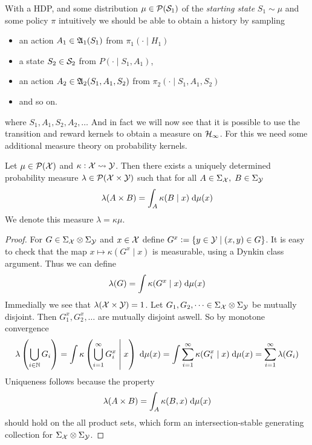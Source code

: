 With a HDP, and some distribution $\mu \in \mathcal{P}(\mathcal{S}_1)$
of the \emph{starting state} $S_1 \sim \mu$
and some policy $\pi$ intuitively we
should be able to obtain a history by sampling
\begin{itemize}
  \item an action $A_1 \in \frak{A}_1(S_1)$ from $\pi_1(\cdot \mid H_1)$
  \item a state $S_2 \in \mathcal{S}_2$ from $P(\cdot \mid S_1, A_1)$,
  \item an action $A_2 \in \frak{A}_2(S_1, A_1, S_2)$ from $\pi_2(\cdot \mid
    S_1, A_1, S_2)$
  \item and so on.
\end{itemize}

where $S_1, A_1, S_2, A_2, \dots$ 
And in fact we will now see that it is possible to use the transition
and reward kernels to obtain a measure on $\mathcal{H}_\infty$.
For this we need some additional measure theory on
probability kernels.

\begin{thm}
  Let $\mu \in \mathcal{P}(\mathcal{X})$ and $\kappa : \mathcal{X} \leadsto \mathcal{Y}$.
  Then there exists a uniquely determined probability measure
  $\lambda \in \mathcal{P}(\mathcal{X} \times \mathcal{Y})$
  such that for all $A \in \Sigma_\mathcal{X}, \; B \in \Sigma_\mathcal{Y}$
  \[ \lambda(A \times B) = \int_A \kappa(B \mid x) \; \mathrm{d} \mu(x) \]
  \label{thm:intKer}
  We denote this measure $\lambda = \kappa \mu$.
\end{thm}
\begin{proof}
  For $G \in \Sigma_\mathcal{X} \otimes \Sigma_\mathcal{Y}$ and $x \in \mathcal{X}$ define
  $G^x \vcentcolon= \{ y \in \mathcal{Y} \mid (x, y) \in G \} $.
  It is easy to check that the map $x \mapsto \kappa(G^x \mid x)$ is
  measurable, using a Dynkin class argument.
  Thus we can define
  \[ \lambda(G) = \int \kappa(G^x \mid x) \; \mathrm{d} \mu(x) \]
  Immedially we see that
  $\lambda(\mathcal{X} \times \mathcal{Y}) = 1$.
  Let $G_1, G_2, \dots \in \Sigma_\mathcal{X} \otimes \Sigma_\mathcal{Y}$ be
  mutually disjoint.
  Then $G_1^x, G_2^x, \dots$ are mutually disjoint aswell.
  So by monotone convergence
  \[ \lambda \left( \bigcup_{i \in \mathbb{N}} G_i \right)
  = \int \kappa\left( \bigcup_{i=1}^\infty G_i^x \;\middle\vert\; x \right) \; \mathrm{d} \mu(x)
    = \int \sum_{i=1}^\infty \kappa(G^x_i \mid x) \; \mathrm{d} \mu(x)
  = \sum_{i=1}^\infty \lambda (G_i) \]
  Uniqueness follows because the property
  \[ \lambda(A \times B) = \int_A \kappa(B, x) \; \mathrm{d} \mu(x) \]
  should hold on the all product sets, which form an
  intersection-stable generating collection for
  $\Sigma_\mathcal{X} \otimes \Sigma_\mathcal{Y}$.
\end{proof}

